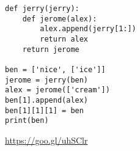 \begin{blocksection}
\question
\begin{lstlisting}
def jerry(jerry):
    def jerome(alex):
        alex.append(jerry[1:])
        return alex
    return jerome
			
ben = ['nice', ['ice']]
jerome = jerry(ben)
alex = jerome(['cream'])
ben[1].append(alex)
ben[1][1][1] = ben
print(ben)
\end{lstlisting}

\begin{solution}[1.5in]
\url{https://goo.gl/uhSClr}
\end{solution}
\end{blocksection}
